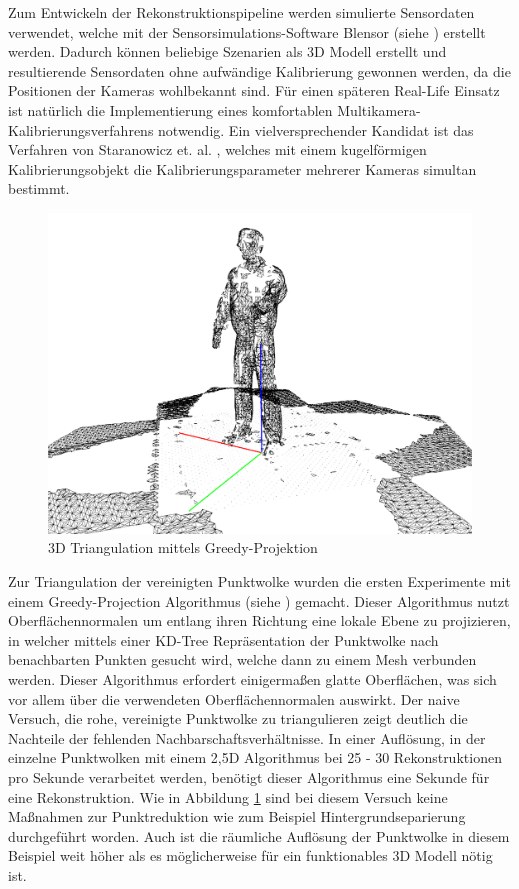 Zum Entwickeln der Rekonstruktionspipeline werden simulierte Sensordaten 
verwendet, welche mit der Sensorsimulations-Software Blensor 
(siehe \cite{Gschwandtner11b}) erstellt werden. Dadurch können beliebige 
Szenarien als 3D Modell erstellt und resultierende Sensordaten ohne aufwändige 
Kalibrierung gewonnen werden, da die Positionen der Kameras wohlbekannt sind. 
Für einen späteren Real-Life Einsatz ist natürlich die Implementierung eines 
komfortablen Multikamera-Kalibrierungsverfahrens notwendig. Ein 
vielversprechender Kandidat ist das Verfahren von Staranowicz et. al. 
\cite{staranowicz2014easy}, welches mit einem kugelförmigen Kalibrierungsobjekt 
die Kalibrierungsparameter mehrerer Kameras simultan bestimmt.

\begin{figure}[H]
	\centering
	\includegraphics[width=.5\textwidth]{figs/meshed}
	\caption{3D Triangulation mittels Greedy-Projektion}
	\label{fig:meshed}
\end{figure}


Zur Triangulation der vereinigten Punktwolke wurden die ersten Experimente mit 
einem Greedy-Projection Algorithmus (siehe \cite{Marton09ICRA}) gemacht. Dieser 
Algorithmus nutzt Oberflächennormalen um entlang ihren Richtung eine lokale 
Ebene zu projizieren, in welcher mittels einer KD-Tree Repräsentation der Punktwolke 
nach benachbarten Punkten gesucht wird, welche dann zu einem Mesh verbunden 
werden. Dieser Algorithmus erfordert einigermaßen glatte Oberflächen, was sich 
vor allem über die verwendeten Oberflächennormalen auswirkt. Der naive Versuch, die 
rohe, vereinigte Punktwolke zu triangulieren zeigt deutlich die Nachteile der 
fehlenden Nachbarschaftsverhältnisse. In einer Auflösung, in der einzelne 
Punktwolken mit einem 2,5D Algorithmus bei 25 - 30 Rekonstruktionen pro Sekunde 
verarbeitet werden, benötigt dieser Algorithmus eine Sekunde für eine 
Rekonstruktion. Wie in Abbildung \ref{fig:meshed} sind bei diesem Versuch keine 
Maßnahmen zur Punktreduktion wie zum Beispiel Hintergrundseparierung 
durchgeführt worden. Auch ist die räumliche Auflösung der Punktwolke in diesem 
Beispiel weit höher als es möglicherweise für ein funktionables 3D Modell nötig 
ist.

